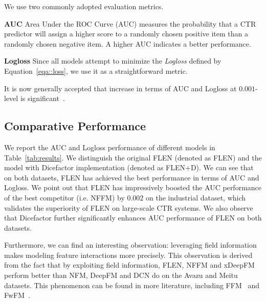 \documentclass[sigconf]{acmart}
\begin{document}
We use two commonly adopted evaluation metrics.

\textbf{AUC} Area Under the ROC Curve (AUC) measures the probability that a CTR predictor will assign a higher score to a randomly chosen positive item than a randomly chosen negative item. A higher AUC indicates a better performance.

\textbf{Logloss} Since all models attempt to minimize the \textit{Logloss} defined by Equation~\ref{eqa::loss}, we use it as a straightforward metric.

It is now generally accepted that increase in terms of AUC and Logloss at $0.001$-level is significant~\citep{cheng2016wide,guo2017deepfm,wang2017deep}. 


\subsection{Comparative Performance}\label{sec::result}
We report the AUC and Logloss performance of different models in Table~\ref{tab:results}. 
We distinguish the original FLEN (denoted as FLEN) and the model with Dicefactor implementation (denoted as FLEN+D). 
We can see that on both datasets, FLEN has achieved the best performance in terms of AUC and Logloss. 
We point out that FLEN has impressively boosted the AUC performance of the best competitor (i.e. NFFM) by $0.002$ on the industrial dataset, which validates the superiority of FLEN on large-scale CTR systems. 
We also observe that Dicefactor further significantly enhances AUC performance of FLEN on both datasets.   

Furthermore, we can find an interesting observation: leveraging field information makes modeling feature interactions more precisely. This observation is derived from the fact that by exploiting field information, FLEN, NFFM and xDeepFM perform better than NFM, DeepFM and DCN do on the Avazu and Meitu datasets. 
This phenomenon can be found in more literature, including FFM~\citep{juan2017field} and FwFM~\citep{pan2018field}.
\end{document}
